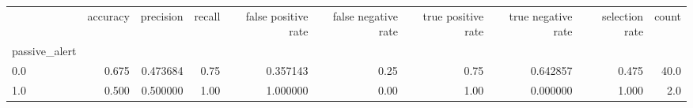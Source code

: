 \begin{tabular}{lrrrrrrrrr}
\toprule
{} &  accuracy &  precision &  recall &  false positive rate &  false negative rate &  true positive rate &  true negative rate &  selection rate &  count \\
passive\_alert &           &            &         &                      &                      &                     &                     &                 &        \\
\midrule
0.0           &     0.675 &   0.473684 &    0.75 &             0.357143 &                 0.25 &                0.75 &            0.642857 &           0.475 &   40.0 \\
1.0           &     0.500 &   0.500000 &    1.00 &             1.000000 &                 0.00 &                1.00 &            0.000000 &           1.000 &    2.0 \\
\bottomrule
\end{tabular}
